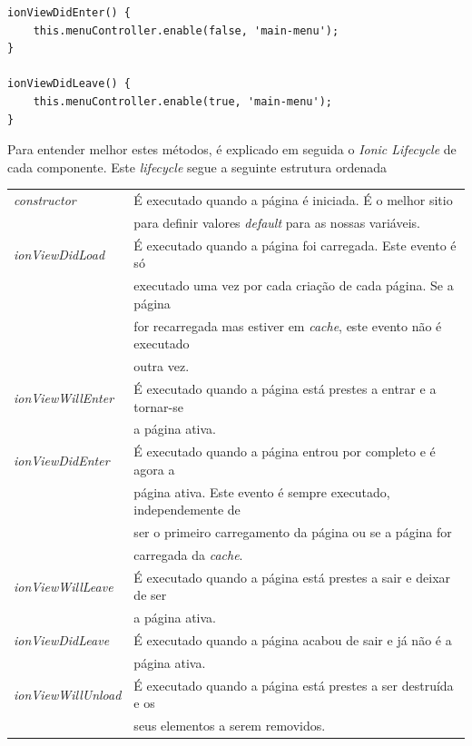 \begin{lstlisting}
ionViewDidEnter() {
	this.menuController.enable(false, 'main-menu');
}

ionViewDidLeave() {
	this.menuController.enable(true, 'main-menu');
}
\end{lstlisting}
\newpage
Para entender melhor estes métodos, é explicado em seguida o \textit{Ionic Lifecycle} de cada componente. Este \textit{lifecycle} segue a seguinte estrutura ordenada\\

\begin{tabular}{ll}
	\textit{constructor} & É executado quando a página é iniciada. É o melhor sitio \\
	&para definir valores \textit{default} para as nossas variáveis.\\
	\textit{ionViewDidLoad} & É executado quando a página foi carregada. Este evento é só \\
	&executado uma vez por cada criação de cada página. Se a página \\
	&for recarregada mas estiver em \textit{cache}, este evento não é executado\\
	& outra vez.\\
	\textit{ionViewWillEnter} & É executado quando a página está prestes a entrar e a tornar-se \\
	&a página ativa.\\
	\textit{ionViewDidEnter} & É executado quando a página entrou por completo e é agora a \\
	&página ativa. Este evento é sempre executado, independemente de \\
	&ser o primeiro carregamento da página ou se a página for \\
	&carregada da \textit{cache}.\\
	\textit{ionViewWillLeave} & É executado quando a página está prestes a sair e deixar de ser \\
	&a página ativa.\\
	\textit{ionViewDidLeave} & É executado quando a página acabou de sair e já não é a \\
	&página ativa.\\
	\textit{ionViewWillUnload} & É executado quando a página está prestes a ser destruída e os \\
	&seus elementos a serem removidos.\\
	
\end{tabular}


